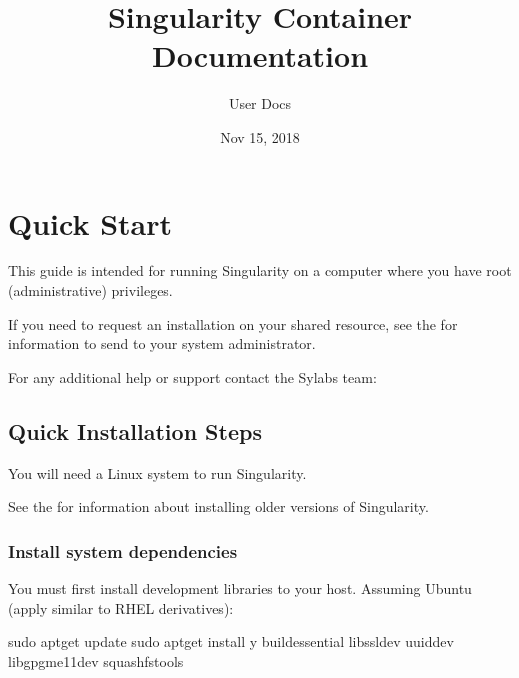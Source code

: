 \documentclass[letterpaper,10pt,english]{sphinxmanual}
\title{Singularity Container Documentation}
\date{Nov 15, 2018}
\author{User Docs}
\begin{document}
\maketitle
\sphinxtableofcontents
{}\label{\detokenize{index::doc}}



\chapter{Quick Start}
\label{\detokenize{quick_start:quick-start}}\label{\detokenize{quick_start:id1}}\label{\detokenize{quick_start::doc}}\label{\detokenize{quick_start:sec-quickstart}}
This guide is intended for running Singularity on a computer where you
have root (administrative) privileges.

If you need to request an installation on your shared resource, see the
 for
information to send to your system administrator.

For any additional help or support contact the Sylabs team:


\section{Quick Installation Steps}
\label{\detokenize{quick_start:quick-installation-steps}}\label{\detokenize{quick_start:quick-installation}}
You will need a Linux system to run Singularity.

See the  for information about installing
older versions of Singularity.


\subsection{Install system dependencies}
\label{\detokenize{quick_start:install-system-dependencies}}
You must first install development libraries to your host. Assuming Ubuntu
(apply similar to RHEL derivatives):

%
\begin{sphinxVerbatim}[commandchars=\\\{\}]
\PYGZdl{} sudo apt\PYGZhy{}get update \PYGZam{}\PYGZam{} sudo apt\PYGZhy{}get install \PYGZhy{}y \PYGZbs{}
    build\PYGZhy{}essential \PYGZbs{}
    libssl\PYGZhy{}dev \PYGZbs{}
    uuid\PYGZhy{}dev \PYGZbs{}
    libgpgme11\PYGZhy{}dev \PYGZbs{}
    squashfs\PYGZhy{}tools
\end{sphinxVerbatim}
\end{document}
